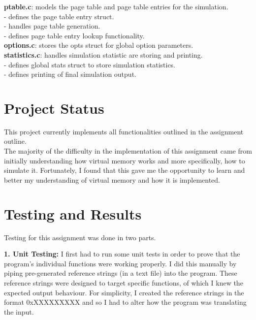 \documentclass{article}
\begin{document}
\noindent
\textbf{ptable.c}: models the page table and page table entries for the simulation. \\
- defines the page table entry struct. \\
- handles page table generation. \\
- defines page table entry lookup functionality. \\

\noindent
\textbf{options.c}: stores the opts struct for global option parameters. \\

\noindent
\textbf{statistics.c}: handles simulation statistic are storing and printing. \\
- defines global stats struct to store simulation statistics. \\
- defines printing of final simulation output. \\

\section{Project Status}
This project currently implements all functionalities outlined in the
assignment outline. \\

\noindent
The majority of the difficulty in the implementation of this
assignment came from initially understanding how virtual memory works and
more specifically, how to simulate it.
Fortunately, I found that this gave me the opportunity to learn and
better my understanding of virtual memory and how it is implemented. \\

\section{Testing and Results}

\noindent
Testing for this assignment was done in two parts.

\noindent
\textbf{1. Unit Testing:}
I first had to run some unit tests in order to prove that the program's individual
functions were working properly. I did this manually by piping pre-generated
reference strings (in a text file) into the program. These reference strings
were designed to target specific functions, of which I knew the expected output
behaviour. For simplicity, I created the reference strings in the format 0xXXXXXXXXX
and so I had to alter how the program was translating the input. \\
\end{document}
